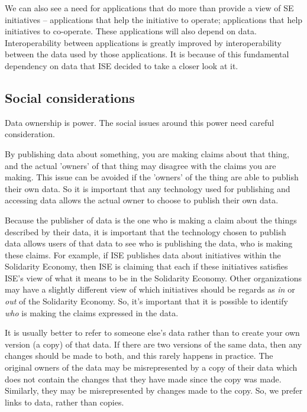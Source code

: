 \documentclass[11pt,twoside,a4paper]{article}
\begin{document}
We can also see a need for applications that do more than provide a view of SE initiatives -- 
applications that help the initiative to operate;
applications that help initiatives to co-operate.
These applications will also depend on data.
Interoperability between applications is greatly improved by interoperability between the data used by those applications.
It is because of this fundamental dependency on data that ISE decided to take a closer look at it.


\subsection*{Social considerations}

Data ownership is power. The social issues around this power need careful consideration.

By publishing data about something, you are making claims about that thing, and the actual 'owners' of that thing may disagree with the claims you are making.
This issue can be avoided if the 'owners' of the thing are able to publish their own data.
So it is important that any technology used for publishing and accessing data allows the actual owner to choose to publish their own data.

Because the publisher of data is the one who is making a claim about the things described by their data,
it is important that the technology chosen to publish data allows users of that data to see who is publishing the data, who is making these claims.
For example, if ISE publishes data about initiatives within the Solidarity Economy, 
then ISE is claiming that each if these initiatives satisfies ISE's view of what it means to be in the Solidarity Economy.
Other organizations may have a slightly different view of which initiatives should be regards as \textit{in} or \textit{out} of the Solidarity Economy.
So, it's important that it is possible to identify \textit{who} is making the claims expressed in the data.

It is usually better to refer to someone else's data rather than to create your own version (a copy) of that data.
If there are two versions of the same data, then any changes should be made to both, and this rarely happens in practice.
The original owners of the data may be misrepresented by a copy of their data which does not contain the changes that they have made since the copy was made.
Similarly, they may be misrepresented by changes made to the copy.
So, we prefer links to data, rather than copies.
\end{document}
